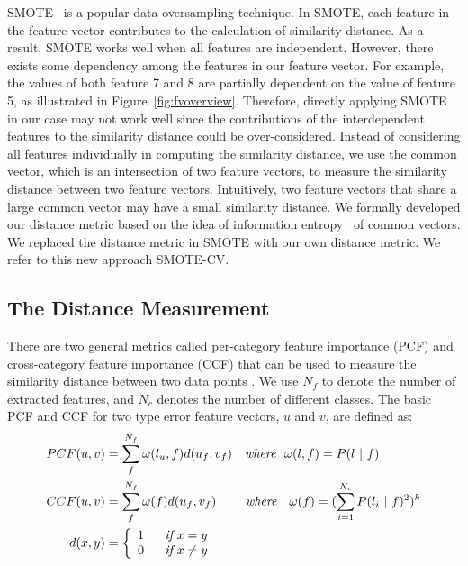 \documentclass[12pt]{report}	%
\begin{document}
%
SMOTE~\cite{Chawla:2002:SSM:1622407.1622416} is a popular
data oversampling technique. In SMOTE, each
feature in the feature vector contributes to the calculation
of similarity distance. As a result, SMOTE works well when
all features are independent. 
%
However, there exists some dependency among
the features in our feature vector. For example, 
the values of both feature 7 and 8 are partially
dependent on the value of feature 5, as illustrated 
in Figure~\ref{fig:fvoverview}. Therefore, directly
applying SMOTE in our case may not work well since
the contributions of the interdependent features to the similarity
distance could be over-considered.
%
Instead of considering all features 
individually in computing the similarity distance,
we use the common vector, which is an
intersection of two feature vectors,
to measure the similarity distance between 
two feature vectors. 
Intuitively, two feature vectors that share 
a large common vector may have a small similarity
distance.
We formally developed our distance metric 
based on the idea of 
information entropy~\cite{shannon2001mathematical}
of common vectors.
We replaced the distance metric in SMOTE with our own distance metric.
We refer to this new approach SMOTE-CV.

\subsection{The Distance Measurement}
\label{sec:smotecv}

There are two general metrics called per-category
feature importance (PCF) and cross-category feature importance (CCF) that
can be used to measure the similarity distance between two data points \cite{creecy1992trading}.
We use $N_{f}$ to denote the number of extracted features, and
$N_{c}$ denotes the number of different classes.
The basic PCF and CCF for two type error feature vectors, $u$ and $v$, are defined as:
\begin{align*}
PCF(u, v) &= \sum_{f}^{N_{f}}\omega(l_{u}, f) d(u_{f}, v_{f})\ \ \ \where\ \ \omega(l, f) = P(l\ |\ f) \\
CCF(u, v) &= \sum_{f}^{N_{f}}\omega(f) d(u_{f}, v_{f})\ \ \ \ \ \ \ \where\ \ \ \omega(f) = (\sum_{i=1}^{N_{c}}P(l_{i}\ |\ f)^2)^k \\
d(x, y) &= \left\{
							\begin{array}{lr}
							1\ \ \ \ \ \ifit\ x = y \\
							0\ \ \ \ \ \ifit\ x \neq y
							\end{array}
				\right.
\end{align*}
\end{document}
